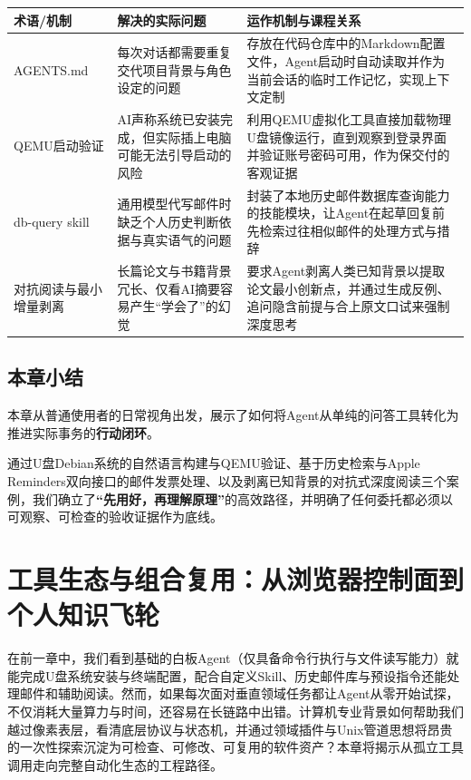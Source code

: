 \documentclass[UTF8,a4paper,11pt,fontset=fandol]{ctexart}
\begin{document}
\begin{center}\small\begin{tabularx}{\linewidth}{YYY}

\toprule

术语/机制 & 解决的实际问题 & 运作机制与课程关系\\\midrule

AGENTS.md & 每次对话都需要重复交代项目背景与角色设定的问题 & 存放在代码仓库中的Markdown配置文件，Agent启动时自动读取并作为当前会话的临时工作记忆，实现上下文定制\\[3pt]

QEMU启动验证 & AI声称系统已安装完成，但实际插上电脑可能无法引导启动的风险 & 利用QEMU虚拟化工具直接加载物理U盘镜像运行，直到观察到登录界面并验证账号密码可用，作为保交付的客观证据\\[3pt]

db-query skill & 通用模型代写邮件时缺乏个人历史判断依据与真实语气的问题 & 封装了本地历史邮件数据库查询能力的技能模块，让Agent在起草回复前先检索过往相似邮件的处理方式与措辞\\[3pt]

对抗阅读与最小增量剥离 & 长篇论文与书籍背景冗长、仅看AI摘要容易产生“学会了”的幻觉 & 要求Agent剥离人类已知背景以提取论文最小创新点，并通过生成反例、追问隐含前提与合上原文口试来强制深度思考\\[3pt]

\bottomrule\end{tabularx}\end{center}

\subsection{本章小结}

本章从普通使用者的日常视角出发，展示了如何将Agent从单纯的问答工具转化为推进实际事务的\textbf{行动闭环}。

通过U盘Debian系统的自然语言构建与QEMU验证、基于历史检索与Apple Reminders双向接口的邮件发票处理、以及剥离已知背景的对抗式深度阅读三个案例，我们确立了\textbf{“先用好，再理解原理”}的高效路径，并明确了任何委托都必须以可观察、可检查的验收证据作为底线。

\section{工具生态与组合复用：从浏览器控制面到个人知识飞轮}

在前一章中，我们看到基础的白板Agent（仅具备命令行执行与文件读写能力）就能完成U盘系统安装与终端配置，配合自定义Skill、历史邮件库与预设指令还能处理邮件和辅助阅读。然而，如果每次面对垂直领域任务都让Agent从零开始试探，不仅消耗大量算力与时间，还容易在长链路中出错。计算机专业背景如何帮助我们越过像素表层，看清底层协议与状态机，并通过领域插件与Unix管道思想将昂贵的一次性探索沉淀为可检查、可修改、可复用的软件资产？本章将揭示从孤立工具调用走向完整自动化生态的工程路径。
\end{document}
